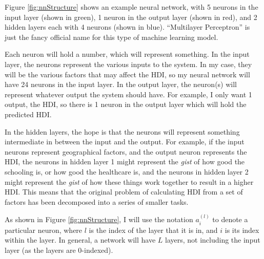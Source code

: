 \documentclass[12pt]{report}
\begin{document}
Figure \ref{fig:nnStructure} shows an example neural network, with 5 neurons in the input layer (shown in green), 1 neuron in the output layer (shown in red), and 2 hidden layers each with 4 neurons (shown in blue). ``Multilayer Perceptron'' is just the fancy official name for this type of machine learning model.

Each neuron will hold a number, which will represent something. In the input layer, the neurons represent the various inputs to the system. In my case, they will be the various factors that may affect the HDI, so my neural network will have 24 neurons in the input layer. In the output layer, the neuron(s) will represent whatever output the system should have. For example, I only want 1 output, the HDI, so there is 1 neuron in the output layer which will hold the predicted HDI.

In the hidden layers, the hope is that the neurons will represent something intermediate in between the input and the output. For example, if the input neurons represent geographical factors, and the output neuron represents the HDI, the neurons in hidden layer 1 might represent the \textit{gist} of how good the schooling is, or how good the healthcare is, and the neurons in hidden layer 2 might represent the \textit{gist} of how these things work together to result in a higher HDI. This means that the original problem of calculating HDI from a set of factors has been decomposed into a series of smaller tasks.

As shown in Figure \ref{fig:nnStructure}, I will use the notation $a^{\left(l\right)}_i$ to denote a particular neuron, where $l$ is the index of the layer that it is in, and $i$ is its index within the layer. In general, a network will have $L$ layers, not including the input layer (as the layers are 0-indexed).
\end{document}
